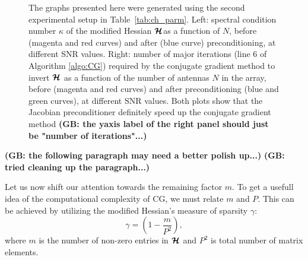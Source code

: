 \documentclass[useAMS,usenatbib]{mn2e}
\newcommand{\bmH}{\bmath{\mathcal{H}}}
\begin{document}
\begin{figure}
\centering
{}
\caption{The graphs presented here were generated using the second experimental setup in Table~\ref{tab:ch_parm}. Left: spectral condition number $\kappa$ of the modified Hessian $\bmH$as a function of $N$, before (magenta and red curves) and after (blue curve) preconditioning, at different SNR values. Right: number of major iterations (line 6 of Algorithm \ref{algo:CG}) required by the conjugate 
gradient method to invert $\bmH$ as a function of the number of antennas $N$ in the array, before (magenta and red curves) and after preconditioning (blue and green curves), at different SNR values. Both plots show that the Jacobian preconditioner definitely speed up the conjugate gradient method {\bf(GB: the yaxis label of the right panel should just be "number of iterations"...)}
\label{fig:kappa_itr}} 
\end{figure}

{\bf (GB: the following paragraph may need a better polish up...)}
{\bf (GB: tried cleaning up the paragraph...)}

Let us now shift our attention towards the remaining factor $m$. To get a usefull idea of the computational complexity of CG, we must relate $m$ and $P$. This can be achieved by utilizing the modified Hessian's measure of sparsity $\gamma$:   
\begin{equation}
 \gamma = \left (1 - \frac{m}{P^2} \right ),
\end{equation}
where $m$ is the number of non-zero entries in $\bmH$  and $P^2$ is total number of matrix elements.
\end{document}
